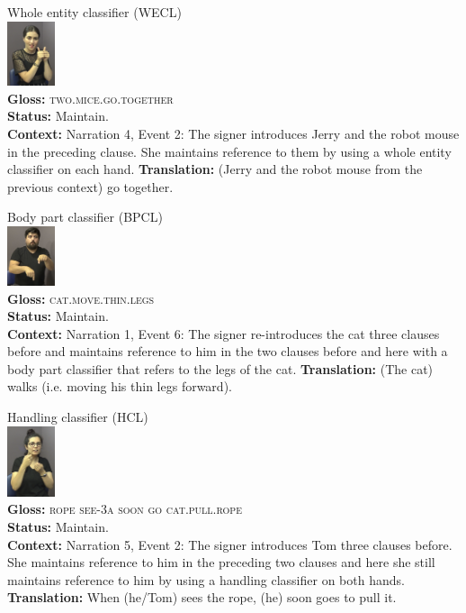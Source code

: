 \documentclass[]{elsarticle} %
\begin{document}
\begin{exe}
\ex
\begin{xlist}
\ex \label{ex:4a} Whole entity classifier  (WECL) \\\glll
{} \includegraphics[width=40pt]{pictures/p6.png} \\ \textbf{Gloss:} \textsc{two.mice.go.together} \\ 
\textbf{Status:} Maintain. \\
\glt \textbf{Context:} Narration 4, Event 2: The signer introduces Jerry and the robot mouse in the preceding clause. She maintains reference to them by using a whole entity classifier on each hand. 
\glt \textbf{Translation:} (Jerry and the robot mouse from the previous context) go together.
\vspace{0.35cm}

\ex \label{ex:4b} Body part classifier (BPCL) \\\glll
{} \includegraphics[width=40pt]{pictures/p7.png} \\ \textbf{Gloss:} \textsc{cat.move.thin.legs} \\ 
\textbf{Status:} Maintain. \\
\glt \textbf{Context:} Narration 1, Event 6: The signer re-introduces the cat three clauses before and maintains reference to him in the two clauses before and here with a body part classifier that refers to the legs of the cat.
\glt \textbf{Translation:} (The cat) walks (i.e. moving his thin legs forward).
\vspace{0.35cm}

\ex \label{ex:4c} Handling classifier (HCL) \\\glll
{} {} {} {} {} \includegraphics[width=40pt]{pictures/p8.png} \\ \textbf{Gloss:} {} \textsc{rope see-3a} \textsc{soon} \textsc{go} \textsc{cat.pull.rope} \\ 
\textbf{Status:} Maintain. \\
\glt \textbf{Context:} Narration 5, Event 2: The signer introduces Tom three clauses before. She maintains reference to him in the preceding two clauses and here she still maintains reference to him by using a handling classifier on both hands.
\glt \textbf{Translation:} When (he/Tom) sees the rope, (he) soon goes to pull it.
\vspace{0.35cm}


\end{xlist}
\end{exe}
\end{document}
